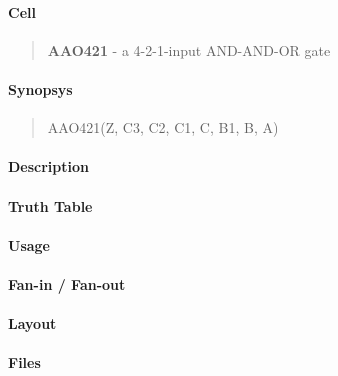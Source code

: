 \label{AAO421}
\paragraph{Cell}
\begin{quote}
    \textbf{AAO421} - a 4-2-1-input AND-AND-OR gate
\end{quote}

\paragraph{Synopsys}
\begin{quote}
    AAO421(Z, C3, C2, C1, C, B1, B, A)
\end{quote}

\paragraph{Description}

%

\paragraph{Truth Table}
%

\paragraph{Usage}

\paragraph{Fan-in / Fan-out}

\paragraph{Layout}

\paragraph{Files}
